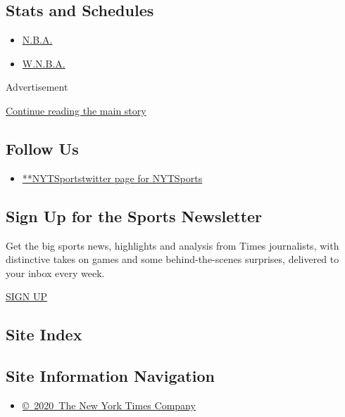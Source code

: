 \hypertarget{stats-and-schedules}{%
\subsection{Stats and Schedules}\label{stats-and-schedules}}

\begin{itemize}
\tightlist
\item
  \protect\hyperlink{}{N.B.A.}
\item
  \protect\hyperlink{}{W.N.B.A.}
\end{itemize}

Advertisement

\protect\hyperlink{after-mktg}{Continue reading the main story}

\hypertarget{follow-us}{%
\subsection{Follow Us}\label{follow-us}}

\begin{itemize}
\tightlist
\item
  \href{https://twitter.com/NYTSports}{**NYTSportstwitter page for
  NYTSports}
\end{itemize}

\hypertarget{sign-up-for-the-sports-newsletter}{%
\subsection{Sign Up for the Sports
Newsletter}\label{sign-up-for-the-sports-newsletter}}

Get the big sports news, highlights and analysis from Times journalists,
with distinctive takes on games and some behind-the-scenes surprises,
delivered to your inbox every week.

\href{/newsletters/signup/SP}{SIGN UP}

\hypertarget{site-index}{%
\subsection{Site Index}\label{site-index}}

\hypertarget{site-information-navigation}{%
\subsection{Site Information
Navigation}\label{site-information-navigation}}

\begin{itemize}
\tightlist
\item
  \href{https://help.nytimes3xbfgragh.onion/hc/en-us/articles/115014792127-Copyright-notice}{©~2020~The
  New York Times Company}
\end{itemize}

